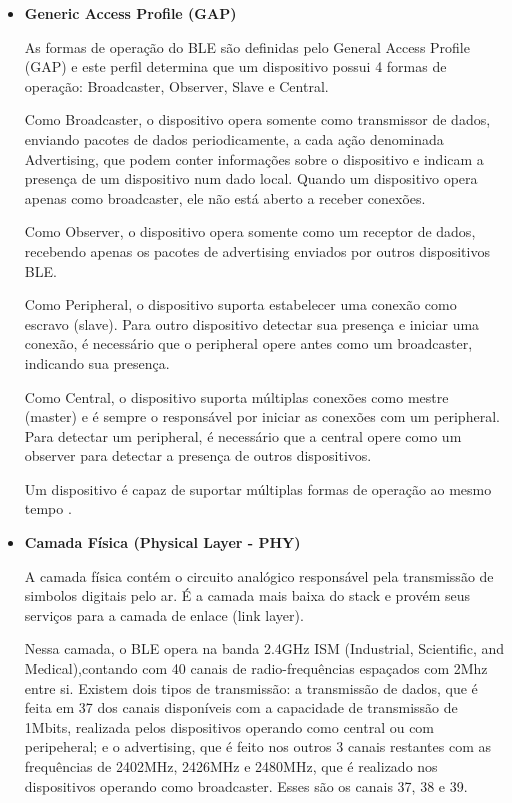 \begin{itemize}

    \item \textbf{Generic Access Profile (GAP)}
    
    As formas de operação do BLE são definidas pelo General Access Profile (GAP) e este perfil determina que um dispositivo possui 4 formas de operação:
    Broadcaster, Observer, Slave e Central.

    Como Broadcaster, o dispositivo opera somente como transmissor de dados, enviando pacotes de dados periodicamente, a cada ação denominada Advertising, que podem conter informações sobre o dispositivo e indicam a presença de um dispositivo num dado local. Quando um dispositivo opera apenas como broadcaster, ele não está aberto a receber conexões.

    Como Observer, o dispositivo opera somente como um receptor de dados, recebendo apenas os pacotes de advertising enviados por outros dispositivos BLE.
    
    Como Peripheral, o dispositivo suporta estabelecer uma conexão como escravo (slave). Para outro dispositivo detectar sua presença e iniciar uma conexão, é necessário que o peripheral opere antes como um broadcaster, indicando sua presença.

    Como Central, o dispositivo suporta múltiplas conexões como mestre (master) e é sempre o responsável por iniciar as conexões com um peripheral. Para detectar um peripheral, é necessário que a central opere como um observer para detectar a presença de outros dispositivos.

    Um dispositivo é capaz de suportar múltiplas formas de operação ao mesmo tempo \cite{Bluetooth_SIG_Site}.

    \item \textbf{Camada Física (Physical Layer - PHY)}
    
    A camada física contém o circuito analógico responsável pela transmissão de simbolos digitais pelo ar. É a camada mais baixa do stack e provém seus serviços para a camada de enlace (link layer). 

    Nessa camada, o BLE opera na banda 2.4GHz ISM (Industrial, Scientific, and Medical),contando com 40 canais de radio-frequências espaçados com 2Mhz entre si. Existem dois tipos de transmissão: a transmissão de dados, que é feita em 37 dos canais disponíveis com a capacidade de transmissão de 1Mbits, realizada pelos dispositivos operando como central ou com peripeheral; e o advertising, que é feito nos outros 3 canais restantes com as frequências de 2402MHz, 2426MHz e 2480MHz, que é realizado nos dispositivos operando como broadcaster. Esses são os canais 37, 38 e 39.


\end{itemize}
